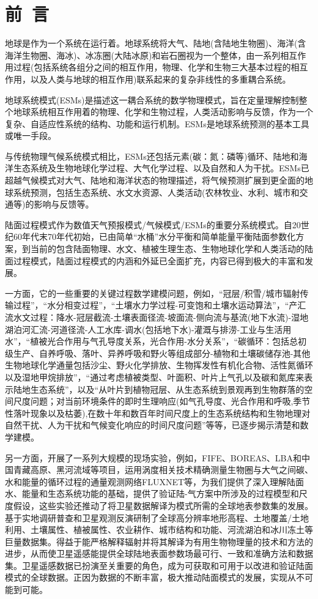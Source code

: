 \chapter*{前~言}

地球是作为一个系统在运行着。地球系统将大气、陆地(含陆地生物圈)、海洋(含海洋生物圈、海冰)、冰冻圈(大陆冰原)和岩石圈视为一个整体，由一系列相互作用过程(包括系统各组分之间的相互作用，物理、化学和生物三大基本过程的相互作用，以及人类与地球的相互作用)联系起来的复杂非线性的多重耦合系统。

地球系统模式(ESMs)是描述这一耦合系统的数学物理模式，旨在定量理解控制整个地球系统相互作用着的物理、化学和生物过程，人类活动影响与反馈，作为一个复杂、自适应性系统的结构、功能和运行机制。ESMs是地球系统预测的基本工具或唯一手段。

与传统物理气候系统模式相比，ESMs还包括元素(碳：氮：磷等)循环、陆地和海洋生态系统及生物地球化学过程、大气化学过程、以及自然和人为干扰。ESMs已超越气候模式对大气、陆地和海洋状态的物理描述，将气候预测扩展到更全面的地球系统预测，包括生态系统、水文水资源、人类活动(农林牧业、水利、城市和交通等)的影响与反馈等。

陆面过程模式作为数值天气预报模式/气候模式/ESMs的重要分系统模式。自20世纪60年代末70年代初始，已由简单“水桶”水分平衡和简单能量平衡陆面参数化方案，到当前的包含陆面物理、水文、植被生理生态、生物地球化学和人类活动的陆面过程模式，陆面过程模式的内涵和外延已全面扩充，内容已得到极大的丰富和发展。

一方面，它的一些重要的关键过程数学建模问题，例如，“冠层/积雪/城市辐射传输过程”，“水分相变过程”，“土壤水力学过程-可变饱和土壤水运动算法”，“产汇流水文过程：降水-冠层截流-土壤表面径流-坡面流-侧向流与基流(地下水流)-湿地湖泊河汇流-河道径流-人工水库-调水(包括地下水)-灌溉与排涝-工业与生活用水”，“植被光合作用与气孔导度关系，光合作用-水分关系”，“碳循环：包括总初级生产、自养呼吸、落叶、异养呼吸和野火等组成部分-植物和土壤碳储存池-其他生物地球化学通量包括沙尘、野火化学排放、生物挥发性有机化合物、活性氮循环以及湿地甲烷排放”，“通过考虑植被类型、叶面积、叶片上气孔以及碳和氮库来表示陆地生态系统”，以及“从叶片到植物冠层、从生态系统到景观再到生物群落的空间尺度问题；对当前环境条件的即时生理响应(如气孔导度、光合作用和呼吸,季节性落叶现象以及枯萎),在数十年和数百年时间尺度上的生态系统结构和生物地理对自然干扰、人为干扰和气候变化响应的时间尺度问题”等等，已逐步揭示清楚和数学建模。

另一方面，开展了一系列大规模的现场实验，例如，FIFE、BOREAS、LBA和中国青藏高原、黑河流域等项目，运用涡度相关技术精确测量生物圈与大气之间碳、水和能量的循环过程的通量观测网络FLUXNET等，为我们提供了深入理解陆面水、能量和生态系统功能的基础，提供了验证陆-气方案中所涉及的过程模型和尺度假设，这些实验还推动了将卫星数据解译为模式所需的全球地表参数集的发展。基于实地调研普查和卫星观测反演研制了全球高分辨率地形高程、土地覆盖/土地利用、土壤属性、植被属性、农业耕作、城市结构和功能、河流湖泊和冰川冻土等巨量数据集。得益于能严格解释辐射并将其解译为有用生物物理量的技术和方法的进步，从而使卫星遥感能提供全球陆地表面参数场最可行、一致和准确方法和数据集。卫星遥感数据已扮演至关重要的角色，成为可获取和可用于以改进和验证陆面模式的全球数据。正因为数据的不断丰富，极大推动陆面模式的发展，实现从不可能到可能。

